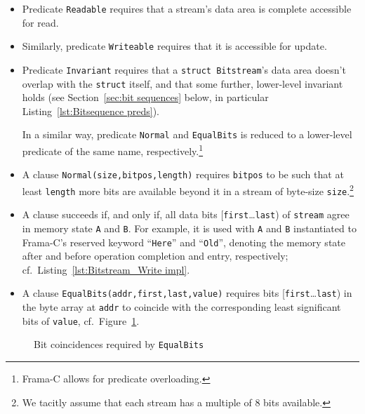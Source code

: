 \begin{itemize}
\item Predicate \lstinline{Readable} requires that a stream's data area is
	complete accessible for read.
\item Similarly, predicate \lstinline{Writeable} requires that it is
	accessible for update.

\item Predicate \lstinline{Invariant} requires that a 
	\lstinline{struct Bitstream}'s data area
	doesn't overlap with the \lstinline{struct} itself, and that some
	further, lower-level invariant holds (see 
	Section~\ref{sec:bit sequences} below, in particular
	Listing~\ref{lst:Bitsequence preds}).

	In a similar way, predicate \lstinline{Normal} and
	\lstinline{EqualBits} is reduced to a
	lower-level predicate of the same 
	name, 
	respectively.\footnote{Frama-C allows for predicate overloading.}

\item
	A clause \lstinline{Normal(size,bitpos,length)} requires
	\lstinline{bitpos} to be such that at least \lstinline{length}
	more bits are available beyond it in a stream of byte-size
	\lstinline{size}.\footnote{
		We tacitly assume that each stream has a multiple of 8 bits
		available.
	}

\item
	A clause
	 succeeds if,
	and only if, 
	all data bits [\lstinline{first}\ldots\lstinline{last})
	of \lstinline{stream} agree in memory state \lstinline{A} and
	\lstinline{B}.
	For example, it is used with \lstinline{A} and \lstinline{B}
	instantiated to Frama-C's reserved keyword ``\lstinline{Here}'' and
	``\lstinline{Old}'', denoting the memory state after and before
	operation completion and entry, respectively; cf.\
	Listing~\ref{lst:Bitstream_Write impl}.

\item
	A clause \lstinline{EqualBits(addr,first,last,value)} requires 
	bits [\lstinline{first}\ldots\lstinline{last}) in
	the byte array at \lstinline{addr} to coincide with the
	corresponding least significant bits of \lstinline{value},
	cf.~Figure~\ref{fig:EqualBits correspondance}.
\end{itemize}


\begin{figure}
\begin{center}
\vspace*{2cm}
\vspace*{2cm}
\caption{\label{fig:EqualBits correspondance}
	Bit coincidences required by \lstinline{EqualBits}}
\end{center}
\end{figure}



